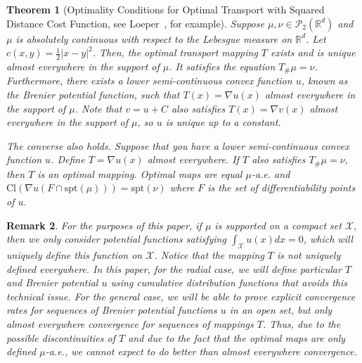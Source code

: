 \documentclass{amsart}
\newtheorem{theorem}{Theorem}
\theoremstyle{lemma}
\newtheorem{remark}[theorem]{Remark}
\theoremstyle{remark}
\begin{document}
\begin{theorem}[Optimality Conditions for Optimal Transport with Squared Distance Cost Function, see Loeper~\cite{LoeperReg}, for example]\label{thm:brenier}
Suppose $\mu, \nu \in \mathcal{P}_{2}(\mathbb{R}^d)$ and $\mu$ is absolutely continuous with respect to the Lebesgue measure on $\mathbb{R}^d$. Let $c(x,y) = \frac{1}{2} \vert x - y \vert^2$. Then, the optimal transport mapping $T$ exists and is unique almost everywhere in the support of $\mu$. It satisfies the equation $T_{\#}\mu = \nu$. Furthermore, there exists a lower semi-continuous convex function $u$, known as the Brenier potential function, such that $T(x) = \nabla u(x)$ almost everywhere in the support of $\mu$. Note that $v = u+C$ also satisfies $T(x) = \nabla v(x)$ almost everywhere in the support of $\mu$, so $u$ is unique up to a constant.

The converse also holds. Suppose that you have a lower semi-continuous convex function $u$. Define $T = \nabla u(x)$ almost everywhere. If $T$ also satisfies $T_{\#}\mu = \nu$, then $T$ is an optimal mapping. Optimal maps are equal $\mu$-a.e. and $\text{Cl}(\nabla u(F \cap \text{spt}(\mu))) = \text{spt}(\nu)$ where $F$ is the set of differentiability points of $u$.

\end{theorem}
\begin{remark}
For the purposes of this paper, if $\mu$ is supported on a compact set $\mathcal{X}$, then we only consider potential functions satisfying $\int_{\mathcal{X}}u(x)dx = 0$, which will uniquely define this function on $\mathcal{X}$. Notice that the mapping $T$ is not uniquely defined everywhere. In this paper, for the radial case, we will define particular $T$ and Brenier potential $u$ using cumulative distribution functions that avoids this technical issue. For the general case, we will be able to prove explicit convergence rates for sequences of Brenier potential functions $u$ in an open set, but only almost everywhere convergence for sequences of mappings $T$. Thus, due to the possible discontinuities of $T$ and due to the fact that the optimal maps are only defined $\mu$-a.e., we cannot expect to do better than almost everywhere convergence.
\end{remark}
\end{document}
